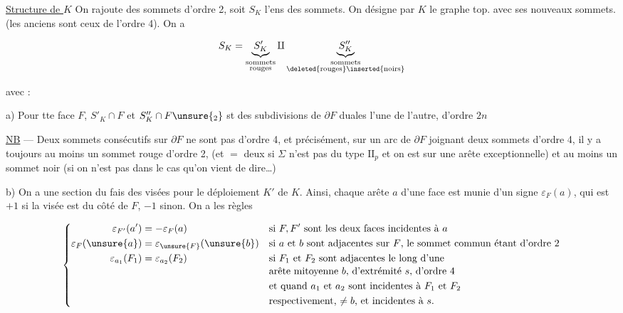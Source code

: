 \uline{Structure de $K$} On rajoute des sommets d'ordre 2, soit $S_K$ l'ens des sommets. On désigne par $K$ le graphe top. avec ses nouveaux sommets. (les anciens sont ceux de l'ordre 4). On a

\[ S_K=\underbrace{S'_K}_{\substack{\text{sommets}\\\text{rouges}}}\amalg
\underbrace{S''_K}_{\substack{\text{sommets}\\\text{\deleted{rouges}\inserted{noirs}}}} \]


avec :

a) Pour tte  face $F$, $S'_K\cap F$ et $S''_K\cap F\unsure{_2}$ st des subdivisions de $\partial F$ duales l'une de l'autre, d'ordre $2n$

 \uline{NB} --- Deux sommets consécutifs sur $\partial F$ ne sont pas d'ordre 4, et  précisément,  sur un arc de $\partial F$ joignant deux sommets d'ordre 4, il y a toujours au moins un sommet rouge d'ordre 2, (et $=$ deux si $\Sigma$ n'est pas  du type $\mathrm{II}_p$ et on est sur une arête exceptionnelle) et au moins un sommet noir (si on n'est  pas dans le cas qu'on vient de dire\ldots)

b)  On a une section du fais des visées pour le déploiement $K'$ de $K$. Ainsi, chaque arête $a$ d'une face  est munie d'un signe $\varepsilon_F(a)$, qui est \deleted{\unsure{$\pm$}}$+1$ si la visée est du côté de $F$, $-1$ sinon. On a les règles

\[
\left\{\begin{aligned}
\varepsilon_{F'}(a')&=-\varepsilon_F(a) &&\text{si $F,F'$ sont les deux faces incidentes à $a$}\\
\varepsilon_F(\unsure{a})&=\varepsilon_{\unsure{F}}(\unsure{b}) &&\text{si $a$ et $b$ sont adjacentes sur $F$, le sommet commun étant d'ordre 2}\\
\varepsilon_{a_1}(F_1)&=\varepsilon_{a_2}(F_2) &&\text{si $F_1$ et $F_2$ sont adjacentes le long d'une}\\[-2pt]
&&&\text{arête mitoyenne $b$, d'extrémité $s$, d'ordre 4}\\
&&&\text{et quand $a_1$ et $a_2$ sont incidentes à $F_1$ et $F_2$}\\
&&&\text{respectivement, $\ne b$, et incidentes à $s$.}
\end{aligned}\right.
\]

